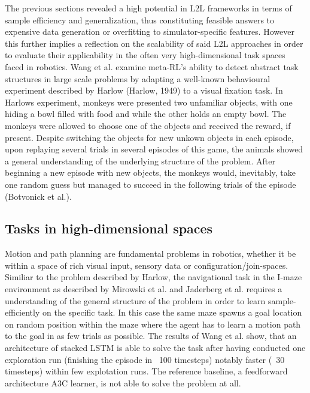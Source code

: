 \documentclass[letterpaper, 10 pt, conference]{ieeeconf}  %
\begin{document}
The previous sections revealed a high potential in L2L frameworks in terms of sample efficiency and generalization, thus constituting 
feasible answers to expensive data generation or overfitting to simulator-specific features. However this further implies a 
reflection on the scalability of said L2L approaches in order to evaluate their applicability in the often very
high-dimensional task spaces faced in robotics. \newline
Wang et al. examine meta-RL's ability to detect abstract task structures in large scale problems by adapting a well-known behavioural experiment 
described by Harlow (Harlow, 1949) to a visual fixation task. In Harlows experiment, monkeys were presented two unfamiliar objects, with one 
hiding a bowl filled with food and while the other holds an empty bowl. The monkeys were allowed to choose one of the objects and received the reward, if present. 
Despite switching the objects for new unkown objects in each episode, upon replaying several trials in several episodes of this game, the animals showed
a general understanding of the underlying structure of the problem. After beginning a new episode with new objects, the monkeys would, inevitably, take 
one random guess but managed to succeed in the following trials of the episode (Botvonick et al.). \newline

\subsection{Tasks in high-dimensional spaces}

Motion and path planning are fundamental problems in robotics, whether it be within a space of rich visual input, sensory data or
configuration/join-spaces. Similiar to the problem described by Harlow, the navigational task in the I-maze environment as described by 
Mirowski et al. and Jaderberg et al. requires a understanding of the general structure of the problem in order to learn sample-efficiently 
on the specific task. In this case the same maze spawns a goal location on random position within the maze where the agent has to learn
a motion path to the goal in as few trials as possible. The results of Wang et al. show, that an architecture of stacked LSTM is able to 
solve the task after having conducted one exploration run (finishing the episode in ~100 timesteps) notably faster (~30 timesteps) within few
explotation runs. The reference baseline, a feedforward architecture A3C learner, is not able to solve the problem at all. 
 
\end{document}
